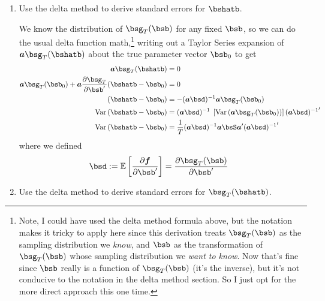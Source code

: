 \documentclass[12pt]{article}
\theoremstyle{plain}
\theoremstyle{definition}
\theoremstyle{remark}
\begin{document}
\begin{enumerate}
  \item Use the delta method to derive standard errors for
    $\bshatb$.

    We know the distribution of $\bsg_T(\bsb)$
    for any fixed $\bsb$,
    so we can do the usual delta function math,\footnote{%
    Note, I could have used the delta method formula above, but the
    notation makes it
    tricky to apply here since this derivation treats
    $\bsg_T(\bsb)$ as the sampling distribution we
    \emph{know}, and $\bsb$ as the transformation of
    $\bsg_T(\bsb)$ whose sampling distribution we
    \emph{want to know}.  Now that's fine since $\bsb$ really
    is a function of $\bsg_T(\bsb)$ (it's the
    inverse), but it's not conducive to the notation in the delta method
    section. So I just opt for the more direct approach this one time.%
    }
    writing out a Taylor Series expansion of $\boldsymbol{a}
    \bsg_T(\bshatb)$ about the true parameter
    vector $\bsb_0$ to get
    \begin{align}
      \boldsymbol{a} \bsg_T(\bshatb)
      &= 0\notag\\
      \boldsymbol{a} \bsg_T(\bsb_0)
      + \boldsymbol{a}
      \frac{\partial \bsg_T}{\partial \bsb'}
      (\bshatb-\bsb_0)
      &= 0\notag\\
      (\bshatb-\bsb_0)
      &=
      -(\boldsymbol{a} \bsd)^{-1}
      \boldsymbol{a} \bsg_T(\bsb_0)
      \label{eq:bhat_b0}\\
      \text{Var}\left(\bshatb-\bsb_0\right)
      &=
      (\boldsymbol{a} \bsd)^{-1}
      \; \left[\text{Var}\left(
        \boldsymbol{a} \bsg_T(\bsb_0)
      \right)
      \right]
      {(\boldsymbol{a} \bsd)^{-1}}'\notag\\
      \text{Var}\left(\bshatb-\bsb_0\right)
      &=
      \frac{1}{T}
      (\boldsymbol{a} \bsd)^{-1}
      \boldsymbol{a} \bsS \boldsymbol{a}'
      {(\boldsymbol{a} \bsd)^{-1}}'\notag
    \end{align}
    where we defined
    \begin{align*}
      \bsd &:=
      \mathbb{E}\left[
        \frac{\partial \boldsymbol{f}}{\partial \bsb'}
      \right]
      =
      \frac{\partial \bsg_T(\bsb)}{%
        \partial \bsb'}
    \end{align*}

  \item Use the delta method to derive standard errors for
    $\bsg_T(\bshatb)$.


\end{enumerate}
\end{document}
